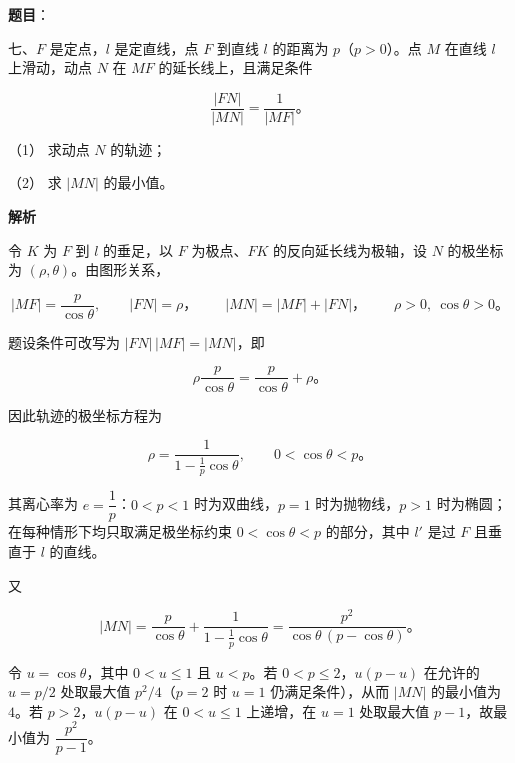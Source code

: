 \begin{answer}

\textbf{题目}：

七、$F$ 是定点，$l$ 是定直线，点 $F$ 到直线 $l$ 的距离为 $p$（$p>0$）。点 $M$ 在直线 $l$ 上滑动，动点 $N$ 在 $MF$ 的延长线上，且满足条件

\nopagebreak[4]
\[
\frac{|FN|}{|MN|}=\frac1{|MF|}\text{。}
\]

（1） 求动点 $N$ 的轨迹；

（2） 求 $|MN|$ 的最小值。

\textbf{解析}


令 $K$ 为 $F$ 到 $l$ 的垂足，以 $F$ 为极点、$FK$ 的反向延长线为极轴，设 $N$ 的极坐标为 $(\rho,\theta)$。由图形关系，

\nopagebreak[4]
\[
|MF|=\frac{p}{\cos\theta},\qquad |FN|=\rho\text{，}\qquad |MN|=|MF|+|FN|\text{，}\qquad \rho>0,\ \cos\theta>0\text{。}
\]

题设条件可改写为 $|FN|\,|MF|=|MN|$，即

\nopagebreak[4]
\[
\rho\frac p{\cos\theta}=\frac p{\cos\theta}+\rho\text{。}
\]

因此轨迹的极坐标方程为

\nopagebreak[4]
\[
\rho=\frac1{1-\frac1p\cos\theta},\qquad 0<\cos\theta<p\text{。}
\]

其离心率为 $e=\dfrac1p$：$0<p<1$ 时为双曲线，$p=1$ 时为抛物线，$p>1$ 时为椭圆；在每种情形下均只取满足极坐标约束 $0<\cos\theta<p$ 的部分，其中 $l'$ 是过 $F$ 且垂直于 $l$ 的直线。
\nopagebreak[4]
\begin{center}\end{center}
\nopagebreak[4]

又

\nopagebreak[4]
\[
|MN|=\frac p{\cos\theta}+\frac1{1-\frac1p\cos\theta}
=\frac{p^2}{\cos\theta\,(p-\cos\theta)}\text{。}
\]

令 $u=\cos\theta$，其中 $0<u\le1$ 且 $u<p$。若 $0<p\le2$，$u(p-u)$ 在允许的 $u=p/2$ 处取最大值 $p^2/4$（$p=2$ 时 $u=1$ 仍满足条件），从而 $|MN|$ 的最小值为 $4$。若 $p>2$，$u(p-u)$ 在 $0<u\le1$ 上递增，在 $u=1$ 处取最大值 $p-1$，故最小值为 $\dfrac{p^2}{p-1}$。



\end{answer}